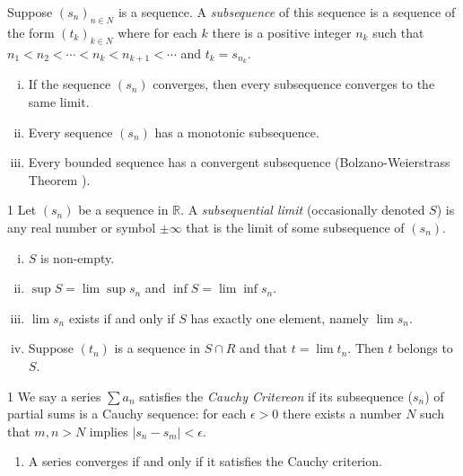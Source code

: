 \begin{defn}{1}
	Suppose $(s_n)_{n\in N}$ is a sequence. A \textit{subsequence} of this sequence is a sequence of the form $(t_k)_{k\in N}$ where for each $k$ there is a positive	integer $n_k$ such that	$n_1 < n_2 < \cdots < n_k < n_{k+1} < \cdots$ and $t_k = s_{n_k}$.
	\begin{enumerate}[(i)]
		\item If the sequence $(s_n)$ converges, then every subsequence converges to the same limit.
		\item Every sequence $(s_n)$ has a monotonic subsequence.
		\item Every bounded sequence has a convergent subsequence (Bolzano-Weierstrass Theorem ).
	\end{enumerate}
\end{defn}


\begin{defn}{1}
	Let $(s_n)$ be a sequence in $\mathbb{R}$. A \textit{subsequential limit} (occasionally denoted $S$) is any real number or symbol $\pm \infty$ that is the limit of some subsequence of $(s_n)$.
	\begin{enumerate}[(i)]
		\item $S$ is non-empty.
		\item $\sup S = \lim \sup s_n$ and $\inf S = \lim \inf s_n$.
		\item $\lim s_n$ exists if and only if $S$ has exactly one element, namely	$\lim s_n$.
		\item Suppose $(t_n)$ is a sequence in $S\cap R$ and that $t = \lim t_n$. Then $t$ belongs to $S$.
	\end{enumerate}
\end{defn}

\begin{defn}{1}
	We say a series $\sum a_n$ satisfies the \textit{Cauchy Critereon} if its subsequence ($s_n$) of partial sums is a Cauchy sequence: for each $\epsilon > 0$ there exists a number $N$ such that $m,n >N$ implies $|s_n-s_m|<\epsilon$. 
	\begin{enumerate}
		\item A series converges if and only if it satisfies the Cauchy criterion.
	\end{enumerate}
\end{defn}

